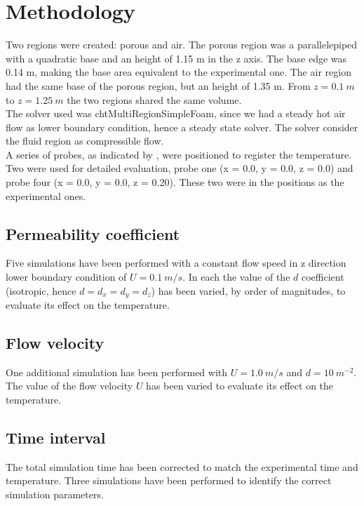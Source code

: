 
\section{Methodology}
\label{section:methodology}

Two regions were created: porous and air.
The porous region was a parallelepiped with a quadratic base and an height of
1.15 m in the z axis. The base edge was 0.14 m, making the base area
equivalent to the experimental one.
The air region had the same base of the porous region, but an height of
1.35 m.
From $z=0.1 ~m$ to $z=1.25 ~m$ the two regions shared the same volume.\\
The solver used was chtMultiRegionSimpleFoam, since we had a steady hot
air flow as lower boundary condition, hence a steady state solver.
The solver consider the fluid region as compressible flow.\\
A series of probes, as indicated by \textcite{RegionProbe}, were positioned to
register the temperature.
Two were used for detailed evaluation, probe one (x = 0.0, y = 0.0, z = 0.0) and
probe four (x = 0.0, y = 0.0, z = 0.20). These two were in the positions as the
experimental ones.

\subsection{Permeability coefficient}
\label{subsection:permeabilitycoefficient}

Five simulations have been performed with a constant flow speed in z
direction lower boundary condition of $U = 0.1 ~m/s$.
In each the value of the $d$ coefficient (isotropic, hence $d = d_x = d_y =
d_z$) has been varied, by order of magnitudes, to evaluate its effect on the temperature.

\subsection{Flow velocity}
\label{subsection:flowvelocity}

One additional simulation has been performed with $U = 1.0 ~m/s$ and
$d = 10 ~m^{-2}$.
The value of the flow velocity $U$ has been varied to
evaluate its effect on the temperature.

\subsection{Time interval}
\label{subsection:timeinterval}

The total simulation time has been corrected to match the experimental time and
temperature.
Three simulations have been performed to identify the correct simulation
parameters.

